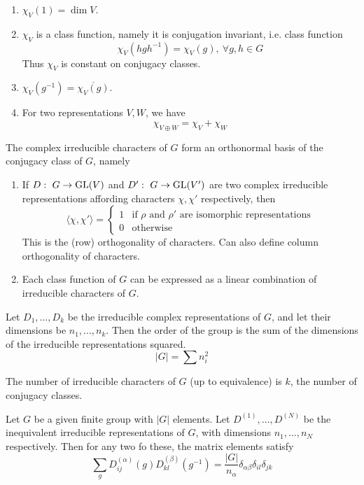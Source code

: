 \documentclass[a4paper]{article}
\begin{document}
\begin{thm}\leavevmode
  \begin{enumerate}
    \item $\chi_V(1) = \dim V$.
    \item $\chi_V$ is a class function, namely it is conjugation invariant, i.e. class function
    $$\chi_V(hgh^{-1}) = \chi_V(g),~\forall g, h \in G$$
    Thus $\chi_V$ is constant on conjugacy classes.
    \item $\chi_V(g^{-1}) = \overline{\chi_V(g)}$.
    \item For two representations $V, W$, we have
$$      \chi_{V \oplus W} = \chi_V + \chi_W$$
  \end{enumerate}
\end{thm}
\begin{thm}
  The complex irreducible characters of $G$ form an orthonormal basis of the conjugacy class of $G$, namely
  \begin{enumerate}
    \item If $D:~G \to \operatorname{GL}(V)$ and $D':~G \to \operatorname{GL}(V')$ are two complex irreducible representations affording characters $\chi, \chi'$ respectively, then
$$\langle\chi, \chi'\rangle =
        \begin{cases}
          1 & \text{if $\rho$ and $\rho'$ are isomorphic representations}\\
          0 & \text{otherwise}
        \end{cases}$$
      This is the (row) orthogonality of characters. Can also define column orthogonality of characters.
    \item Each class function of $G$ can be expressed as a linear combination of irreducible characters of $G$.
  \end{enumerate}
\end{thm}
\begin{thm}
  Let $D_1, \dots, D_k$ be the irreducible complex representations of $G$, and let their dimensions be $n_1, \dots, n_k$. Then the order of the group is the sum of the dimensions of the irreducible representations squared.
$$    |G| = \sum n_i^2$$
\end{thm}
\begin{cor}
  The number of irreducible characters of $G$ (up to equivalence) is $k$, the number of conjugacy classes.
\end{cor}
\begin{thm}
Let $G$ be a given finite group with $|G|$ elements. Let $D^{(1)},\dots,D^{(N)}$ be the inequivalent irreducible representations of $G$, with dimensions $n_1,\dots,n_N$ respectively. Then for any two fo these, the matrix elements satisfy
$$\sum_gD_{ij}^{(\alpha)}(g)D^{(\beta)}_{kl}(g^{-1})=\frac{|G|}{n_\alpha}\delta_{\alpha\beta}\delta_{il}\delta_{jk}$$
\end{thm}
\end{document}
